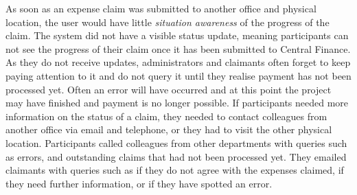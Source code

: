 As soon as an expense claim was submitted to another office and physical location, the user would have little \textit{situation awareness} of the progress of the claim. The system did not have a visible status update, meaning participants can not see the progress of their claim once it has been submitted to Central Finance. As they do not receive updates, administrators and claimants often forget to keep paying attention to it and do not query it until they realise payment has not been processed yet. Often an error will have occurred and at this point the project may have finished and payment is no longer possible. If participants needed more information on the status of a claim, they needed to contact colleagues from another office via email and telephone, or they had to visit the other physical location.  Participants called colleagues from other departments with queries such as errors, and outstanding claims that had not been processed yet. They emailed claimants with queries such as if they do not agree with the expenses claimed, if they need further information, or if they have spotted an error.


%
%
%


